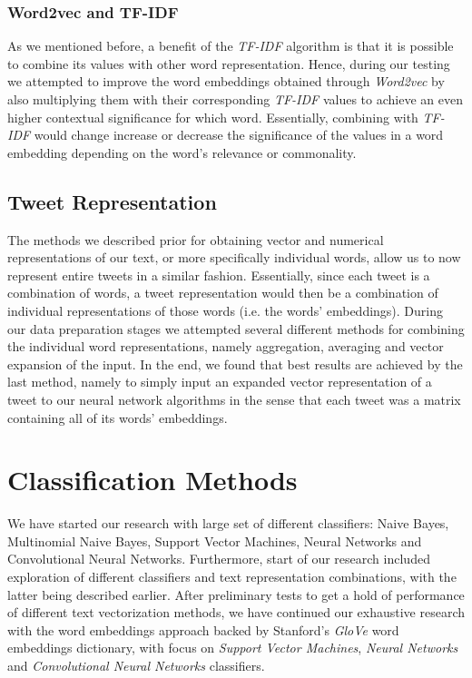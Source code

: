\documentclass[10pt,conference]{IEEEtran}
\begin{document}
\subsubsection{Word2vec and TF-IDF}
As we mentioned before, a benefit of the \textit{TF-IDF} algorithm is that it is possible to combine its values with other word representation. Hence, during our testing we attempted to improve the word embeddings obtained through \textit{Word2vec} by also multiplying them with their corresponding \textit{TF-IDF} values to achieve an even higher contextual significance for which word. Essentially, combining with \textit{TF-IDF} would change increase or decrease the significance of the values in a word embedding depending on the word's relevance or commonality.

\subsection{Tweet Representation}
The methods we described prior for obtaining vector and numerical representations of our text, or more specifically individual words, allow us to now represent entire tweets in a similar fashion. Essentially, since each tweet is a combination of words, a tweet representation would then be a combination of individual representations of those words (i.e. the words' embeddings). During our data preparation stages we attempted several different methods for combining the individual word representations, namely aggregation, averaging and vector expansion of the input. In the end, we found that best results are achieved by the last method, namely to simply input an expanded vector representation of a tweet to our neural network algorithms in the sense that each tweet was a matrix containing all of its words' embeddings.


\section{Classification Methods}

We have started our research with large set of different classifiers: Naive Bayes, Multinomial Naive Bayes, Support Vector Machines, Neural Networks and Convolutional Neural Networks.  Furthermore, start of our research included exploration of different classifiers and text representation combinations, with the latter being described earlier. After preliminary tests to get a hold of performance of different text vectorization methods, we have continued our exhaustive research with the word embeddings approach backed by Stanford's \textit{GloVe} word embeddings dictionary, with focus on \textit{Support Vector Machines}, \textit{Neural Networks} and \textit{Convolutional Neural Networks} classifiers.
\end{document}
